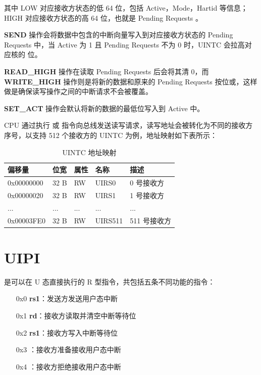 其中 LOW 对应接收方状态的低 64 位，包括 Active，Mode，Hartid 等信息；HIGH 对应接收方状态的高 64 位，也就是 Pending Requests 。

\textbf{SEND} 操作会将数据中包含的中断向量写入到对应接收方状态的 Pending Requests 中，当 Active 为 1 且 Pending Requests 不为 0 时，UINTC 会拉高对应核的 \FcsrUipUsip 位。

\textbf{READ\_HIGH} 操作在读取 Pending Requests 后会将其清 0，而 \textbf{WRITE\_HIGH} 操作则是将新的数据和原来的 Pending Requests 按位或，这样做是确保读写操作之间的中断请求不会被覆盖。

\textbf{SET\_ACT} 操作会默认将新的数据的最低位写入到 Active 中。

CPU 通过执行 \Isd 或 \Ild 指令向总线发送读写请求，读写地址会被转化为不同的接收方序号，以支持 512 个接收方的 UINTC 为例，地址映射如下表所示：

\begin{table}
    \centering
    \begin{threeparttable}[c]
        \label{tab:three-part-table-5}
        \begin{tabular}{|l|l|l|l|l|}
            \hline
            偏移量 & 位宽 & 属性 & 名称 & 描述 \\
            \hline
            0x00000000 & 32 B & RW & UIRS0 & 0 号接收方 \\
            \hline
            0x00000020 & 32 B & RW & UIRS1 & 1 号接收方 \\
            \hline
            ... & ... & ... & ... & ... \\
            \hline
            0x00003FE0 & 32 B & RW & UIRS511 & 511 号接收方 \\
            \hline
        \end{tabular}
        \caption{UINTC 地址映射}
    \end{threeparttable}
\end{table}

\section{UIPI}

\Iuipi 是可以在 U 态直接执行的 R 型指令，共包括五条不同功能的指令：

\begin{itemize}
    \item[0x0] \textbf{\Iuipisend rs1}：发送方发送用户态中断
    \item[0x1] \textbf{\Iuipiread rd}：接收方读取并清空中断等待位
    \item[0x2] \textbf{\Iuipiwrite rs1}：接收方写入中断等待位
    \item[0x3] \textbf{\Iuipiact}：接收方准备接收用户态中断
    \item[0x4] \textbf{\Iuipideact}：接收方拒绝接收用户态中断
\end{itemize}

